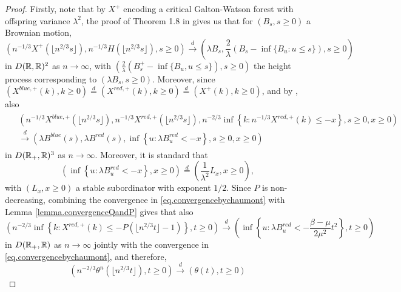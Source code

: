 \begin{proof} 
Firstly, note that by $X^+$ encoding a critical Galton-Watson forest with offspring variance $\lambda^2$, the proof of Theorem 1.8 in \cite{Legall2005} gives us that for $(B_s,s\geq 0)$ a Brownian motion,
\begin{equation}\label{eq.convergenceX}\left(n^{-1/3}X^+\left(\lfloor n^{2/3}s\rfloor \right), n^{-1/3}H\left(\lfloor n^{2/3}s\rfloor \right), s\geq 0 \right) \overset{d}{\to} \left(\lambda B_s,\frac{2}{\lambda} \left(B_s-\inf\{B_u:u\leq s\}\right),  s\geq 0\right) \end{equation}
 in $D({\mathbb R},{\mathbb R})^2$ as $n\to \infty$, with $\left(\frac{2}{\lambda}(B^+_s-\inf\{B_u,u\leq s\}),s\geq 0\right)$ the height process corresponding to $\left(\lambda B_s,s \geq 0\right)$. Moreover, since $(X^{blue,+}(k),k\geq 0)\overset{d}{=}(X^{red,+}(k),k\geq 0)\overset{d}{=}(X^+(k),k\geq 0)$, and by \cite{Chaumont2010}, also
\begin{align}\begin{split}\label{eq.convergencebychaumont}&\left(n^{-1/3}X^{blue,+}\left(\lfloor n^{2/3} s \rfloor \right), n^{-1/3}X^{red,+}\left(\lfloor n^{2/3} s \rfloor \right), n^{-2/3}\inf\left\{k:n^{-1/3}X^{red,+}(k) \leq -x\right\}, s \geq 0, x\geq 0 \right)\\
&\overset{d}{\to}\left(\lambda B^{blue}(s), \lambda B^{red}(s), \inf\left\{u:\lambda B^{red}_u < -x\right\}, s\geq 0, x \geq 0\right)\end{split}\end{align}
in $D({\mathbb R}_+,{\mathbb R})^3$ as $n\to \infty$. Moreover, it is standard that 
\begin{equation}\label{eq.hittingtimestableprocess}\left(\inf\left\{u:\lambda B^{red}_u < -x\right\},x\geq 0\right)\overset{d}{=}\left(\frac{1}{\lambda^2}L_x,x\geq 0\right),\end{equation}
with $(L_x,x\geq 0)$ a stable subordinator with exponent $1/2$.
Since $P$ is non-decreasing, combining the convergence in \eqref{eq.convergencebychaumont} with Lemma \ref{lemma.convergenceQandP} gives that also
$$\left(n^{-2/3}\inf\left\{k:X^{red,+}(k) \leq - P\left(\lfloor n^{2/3} t \rfloor -1\right)\right\},t\geq 0\right)\overset{d}{\to}\left(\inf\left\{u:\lambda B^{red}_u< -\frac{\beta - \mu}{2\mu^2} t^2\right\},t\geq 0\right)$$
  in $D({\mathbb R}_+,{\mathbb R})$ as $n\to \infty$ jointly with the convergence in \eqref{eq.convergencebychaumont},
  and therefore, 
 \begin{equation}\label{eq.convergencetheta}\left(n^{-2/3}\theta^n\left(\lfloor n^{2/3}t\rfloor \right),t\geq 0 \right) \overset{d}{\to} \left(\theta(t),t\geq 0\right)\end{equation}

\end{proof}
